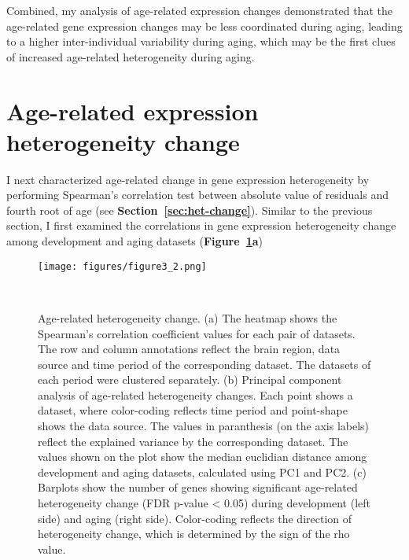 Combined, my analysis of age-related expression changes demonstrated that the age-related gene expression changes may be less coordinated during aging,
leading to a higher inter-individual variability during aging, which may be the first clues of increased age-related heterogeneity during aging.

\section{Age-related expression heterogeneity change}
I next characterized age-related change in gene expression heterogeneity by performing Spearman's correlation test between absolute value of residuals and fourth root of age (see \textbf{Section~\ref{sec:het-change}}).
Similar to the previous section, I first examined the correlations in gene expression heterogeneity change among development and aging datasets (\textbf{Figure~\ref{fig:fig3.2}a})


\begin{figure}[h]
    \centering
    \texttt{[image: figures/figure3\_2.png]}
    \caption{Age-related heterogeneity change. 
    (a) The heatmap shows the Spearman's correlation coefficient values for each pair of datasets.
    The row and column annotations reflect the brain region, data source and time period of the corresponding dataset.
    The datasets of each period were clustered separately.
    (b) Principal component analysis of age-related heterogeneity changes. Each point shows a dataset, 
    where color-coding reflects time period and point-shape shows the data source. 
    The values in paranthesis (on the axis labels) reflect the explained variance by the corresponding dataset.
    The values shown on the plot show the median euclidian distance among development and aging datasets, 
    calculated using PC1 and PC2.
    (c) Barplots show the number of genes showing significant age-related heterogeneity change (FDR p-value < 0.05) during development (left side) and aging (right side).
    Color-coding reflects the direction of heterogeneity change, which is determined by the sign of the rho value.
    }~\label{fig:fig3.2}
\end{figure}

